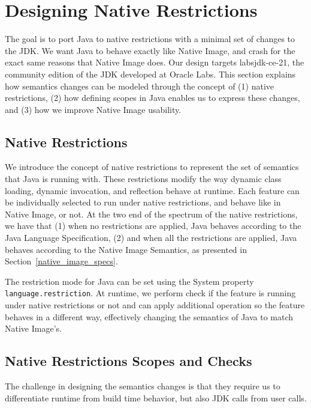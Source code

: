 \chapter{Designing Native Restrictions}

The goal is to port Java to native restrictions with a minimal set of changes to the JDK. We want Java to behave exactly like Native Image, and crash for the exact same reasons that Native Image does. Our design targets labsjdk-ce-21, the community edition of the JDK developed at Oracle Labs. 
This section explains how semantics changes can be modeled through the concept of (1) native restrictions, (2) how defining scopes in Java enables us to express these changes, and (3) how we improve Native Image usability.

\section{Native Restrictions}
We introduce the concept of native restrictions to represent the set of semantics that Java is running with. These restrictions modify the way dynamic class loading, dynamic invocation, and reflection behave at runtime. Each feature can be individually selected to run under native restrictions, and behave like in Native Image, or not.
At the two end of the spectrum of the native restrictions, we have that (1) when no restrictions are applied, Java behaves according to the Java Language Specification, (2) and when all the restrictions are applied, Java behaves according to the Native Image Semantics, as presented in Section~\ref{native_image_specs}. 

The restriction mode for Java can be set using the System property \verb|language.restriction|. At runtime, we perform check if the feature is running under native restrictions or not and can apply additional operation so the feature behaves in a different way, effectively changing the semantics of Java to match Native Image's.

\section{Native Restrictions Scopes and Checks}
The challenge in designing the semantics changes is that they require us to differentiate runtime from build time behavior, but also JDK calls from user calls.

